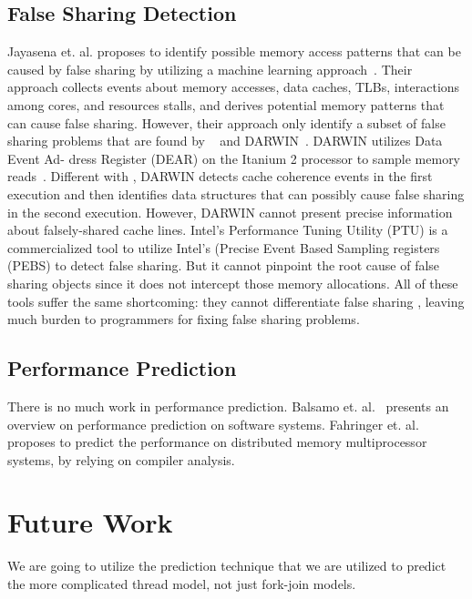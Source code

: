 \label{sec:relatedwork}

\subsection{False Sharing Detection}
Jayasena et. al. proposes to identify possible memory access patterns that can be caused by false sharing by utilizing a machine learning approach~\cite{mldetect}. Their approach collects events about memory accesses, data caches, TLBs, interactions among cores, and resources stalls, and derives potential memory patterns that can cause false sharing. However, their approach only identify a subset of false sharing problems that are found by \Predator{}~\cite{Predator} and DARWIN~\cite{openmp}. DARWIN utilizes Data Event Ad-
dress Register (DEAR) on the Itanium 2 processor to sample memory reads~\cite{Wicaksono11detectingfalse, openmp}. Different with \Cheetah{}, DARWIN detects cache coherence events in the first execution and then identifies data structures that can possibly cause false sharing in the second execution.  However, DARWIN cannot present precise information about falsely-shared cache lines. Intel's Performance Tuning Utility (PTU) is a commercialized tool to utilize Intel's (Precise Event Based Sampling registers (PEBS) to detect false sharing. But it cannot pinpoint the root cause of false sharing objects since it does not intercept those memory allocations. 
All of these tools suffer the same shortcoming: they cannot differentiate false sharing , leaving much burden to programmers for fixing false sharing problems. 

\subsection{Performance Prediction} 
There is no much work in performance prediction. Balsamo et. al.~\cite{Balsamo:2004:MPP:987527.987640} presents an overview on performance prediction on software systems. 
Fahringer et. al. proposes to predict the performance on distributed memory multiprocessor systems, by relying on compiler analysis. 


\section{Future Work}

We are going to utilize the prediction technique that we are utilized to predict the more complicated thread model, not just fork-join models. 


